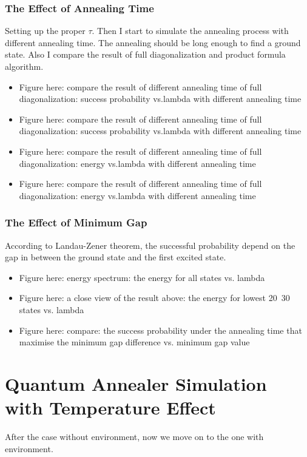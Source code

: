 \documentclass[twoside,a4paper,article]{combine}
\begin{document}
\subsubsection{The Effect of Annealing Time}
	Setting up the proper $\tau$. Then I start to simulate the annealing process with different annealing time. The annealing should be long enough to find a ground state. Also I compare the result of full diagonalization and product formula algorithm. 
	\begin{itemize}
		\item Figure here: compare the result of different annealing time of full diagonalization: success probability vs.lambda with different annealing time
		\item \checkmark Figure here: compare the result of different annealing time of full diagonalization: success probability vs.lambda with different annealing time
		\item \checkmark Figure here: compare the result of different annealing time of full diagonalization: energy vs.lambda with different annealing time
		\item \checkmark Figure here: compare the result of different annealing time of full diagonalization: energy vs.lambda with different annealing time
	\end{itemize}
\subsubsection{The Effect of Minimum Gap}
	According to Landau-Zener theorem, the successful probability depend on the gap in between the ground state and the first excited state.
	\begin{itemize}
		\item \checkmark Figure here: energy spectrum: the energy for all states vs. lambda
		\item \checkmark Figure here: a close view of the result above: the energy for lowest 20~30 states vs. lambda
		\item \checkmark Figure here: compare: the success probability under the annealing time that maximise the minimum gap difference vs. minimum gap value 
	\end{itemize}
	
\section{Quantum Annealer Simulation with Temperature Effect}
	After the case without environment, now we move on to the one with environment.
\end{document}
